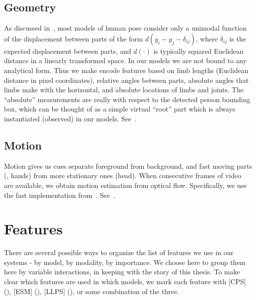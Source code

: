 \section{Geometry}\label{sec:geom}
As discussed in~, most models of human pose consider only a unimodal 
function of the displacement between parts of the form $d(y_i - y_j - 
\delta_{ij})$, where $\delta_{ij}$ is the expected displacement between parts, 
and $d(\cdot)$ is typically squared Euclidean distance in a linearly 
transformed space.  In our models we are not bound to any analytical form.  
Thus we make encode features based on limb lengths (Euclidean distance in pixel 
coordinates), relative angles between parts, absolute angles that limbs make 
with the horizontal, and absolute locations of limbs and joints.  The 
``absolute'' measurements are really with respect to the detected person 
bounding box, which can be thought of as a simple virtual ``root'' part which 
is always instantiated (observed) in our models.  
See~.

\section{Motion}\label{sec:motion} Motion gives us cues separate foreground 
from background, and fast moving parts (\eg, hands) from more stationary ones 
(\eg head).  When consecutive frames of video are available, we obtain motion 
estimation from optical flow.  Specifically, we use the fast implementation 
from~\citet{liu-optflow}.  See~.




\chapter{Features}

There are several possible ways to organize the list of features we use in our 
systems - by model, by modality, by importance.  We choose here to group them 
here by variable interactions, in keeping with the story of this thesis.  To 
make clear which features are used in which models, we mark each feature with 
[CPS] (), [ESM] (), [LLPS] (), or 
some combination of the three.


